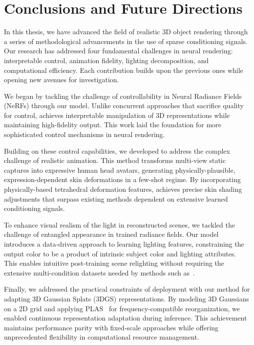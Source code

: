 \chapter{Conclusions and Future Directions}
\label{chap:final}

In this thesis, we have advanced the field of realistic 3D object rendering
through a series of methodological advancements in the use of sparse
conditioning signals.
Our research has addressed four fundamental challenges in neural rendering:
interpretable control, animation fidelity, lighting decomposition, and
computational efficiency.
Each contribution builds upon the previous ones while opening new avenues for
investigation.

We began by tackling the challenge of controllability in Neural Radiance
Fields (NeRFs) through our \conerf model.
Unlike concurrent approaches that sacrifice quality for control, \conerf
achieves interpretable manipulation of 3D representations while maintaining
high-fidelity output.
This work laid the foundation for more sophisticated control mechanisms in
neural rendering.

Building on these control capabilities, we developed \blendfields to address
the complex challenge of realistic animation.
This method transforms multi-view static captures into expressive human head
avatars, generating physically-plausible, expression-dependent skin
deformations in a few-shot regime.
By incorporating physically-based tetrahedral deformation features,
\blendfields achieves precise skin shading adjustments that surpass existing
methods dependent on extensive learned conditioning signals.

To enhance visual realism of the light in reconstructed scenes, we tackled the
challenge of entangled appearance in trained radiance fields.
Our \lumigauss model introduces a data-driven approach to learning lighting
features, constraining the output color to be a product of intrinsic subject
color and lighting attributes.
This enables intuitive post-training scene relighting without requiring the
extensive multi-condition datasets needed by methods such
as~\textcite{saito2024relightable}.

Finally, we addressed the practical constraints of deployment with our \clog
method for adapting 3D Gaussian Splats (3DGS) representations.
By modeling 3D Gaussians on a 2D grid and applying
PLAS~\cite{morgenstern2024compact} for frequency-compatible reorganization, we
enabled continuous representation adaptation during inference.
This achievement maintains performance parity with fixed-scale approaches
while offering unprecedented flexibility in computational resource management.

